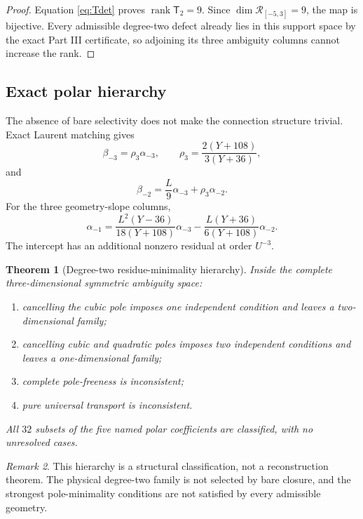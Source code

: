 \documentclass[11pt]{article}
\newtheorem{theorem}{Theorem}[section]
\theoremstyle{definition}
\theoremstyle{remark}
\newtheorem{remark}[theorem]{Remark}
\newcommand{\cR}{\mathcal{R}}
\newcommand{\rank}{\operatorname{rank}}
\begin{document}
\begin{proof}
Equation \eqref{eq:Tdet} proves $\rank\mathsf T_2=9$.  Since $\dim\cR_{[-5,3]}=9$, the map is bijective.  Every admissible degree-two defect already lies in this support space by the exact Part III certificate, so adjoining its three ambiguity columns cannot increase the rank.
\end{proof}

\subsection{Exact polar hierarchy}

The absence of bare selectivity does not make the connection structure trivial.  Exact Laurent matching gives
\begin{equation}\label{eq:rho}
\beta_{-3}=\rho_3\alpha_{-3},
\qquad
\rho_3=\frac{2(Y+108)}{3(Y+36)},
\end{equation}
and
\begin{equation}\label{eq:beta2}
\beta_{-2}=\frac{L}{9}\alpha_{-3}+\rho_3\alpha_{-2}.
\end{equation}
For the three geometry-slope columns,
\begin{equation}\label{eq:alpha1dep}
\alpha_{-1}
=\frac{L^2(Y-36)}{18(Y+108)}\alpha_{-3}
-\frac{L(Y+36)}{6(Y+108)}\alpha_{-2}.
\end{equation}
The intercept has an additional nonzero residual at order $U^{-3}$.

\begin{theorem}[Degree-two residue-minimality hierarchy]\label{thm:polar}
Inside the complete three-dimensional symmetric ambiguity space:
\begin{enumerate}[label=(\roman*)]
\item cancelling the cubic pole imposes one independent condition and leaves a two-dimensional family;
\item cancelling cubic and quadratic poles imposes two independent conditions and leaves a one-dimensional family;
\item complete pole-freeness is inconsistent;
\item pure universal transport is inconsistent.
\end{enumerate}
All $32$ subsets of the five named polar coefficients are classified, with no unresolved cases.
\end{theorem}

\begin{remark}
This hierarchy is a structural classification, not a reconstruction theorem.  The physical degree-two family is not selected by bare closure, and the strongest pole-minimality conditions are not satisfied by every admissible geometry.
\end{remark}
\end{document}
